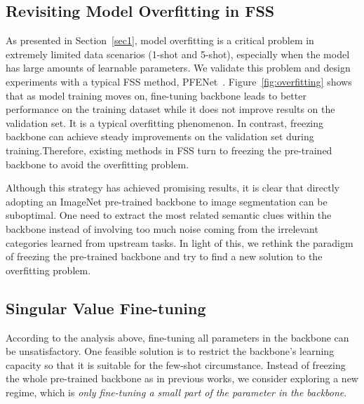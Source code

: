 \documentclass{article}
\begin{document}
\subsection{Revisiting Model Overfitting in FSS} \label{sec3.1}
\vspace{-.5em}
As presented in Section~\ref{sec1}, model overfitting is a critical problem in extremely limited data scenarios (1-shot and 5-shot), especially when the model has large amounts of learnable parameters. We validate this problem and design experiments with a typical FSS method, PFENet~\cite{tian2020prior}. Figure~\ref{fig:overfitting} shows that as model training moves on, fine-tuning backbone leads to better performance 
on the training dataset while it does not improve results on the validation set. It is a typical overfitting phenomenon. In contrast, freezing backbone can achieve steady improvements on the validation set during training.Therefore, existing methods in FSS turn to freezing the pre-trained backbone to avoid the overfitting problem. 

Although this strategy has achieved promising results, it is clear that directly adopting an ImageNet pre-trained backbone to image segmentation can be suboptimal. One need to extract the most related semantic clues within the backbone instead of involving too much noise coming from the irrelevant categories learned from upstream tasks.
In light of this, we rethink the paradigm of freezing the pre-trained backbone and try to find a new solution to the overfitting problem.
\vspace{-.5em}
\subsection{Singular Value Fine-tuning} \label{sec3.2}
\vspace{-.4em}
According to the analysis above, fine-tuning all parameters in the backbone can be unsatisfactory. One feasible solution is to restrict the backbone's learning capacity so that it is suitable for the few-shot circumstance. Instead of freezing the whole pre-trained backbone as in previous works, we consider exploring a new regime, which is {\em only fine-tuning a small part of the parameter in the backbone}.
\end{document}

